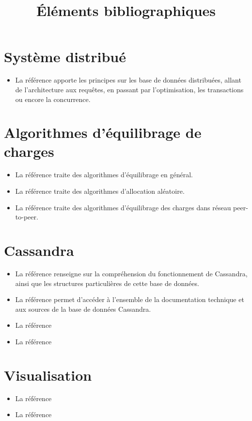 \documentclass[12 pt]{article}
\title{Éléments bibliographiques}
\begin{document}
\maketitle
\section{Système distribué}

\begin{itemize}
\item La référence \cite{RefOzsu2011} apporte les principes sur les base de données distribuées, allant de l'architecture aux requêtes, en passant par l'optimisation, les transactions ou encore la concurrence.
\end{itemize}


\section{Algorithmes d'équilibrage de charges}


\begin{itemize}
\item La référence \cite{RefArtbalancedalloc} traite des algorithmes d'équilibrage en général.

\item La référence \cite{RefRand} traite des algorithmes d'allocation aléatoire.

\item La référence \cite{RefLoadBalancingPeertoPeer} traite des algorithmes d'équilibrage des charges dans réseau peer-to-peer.
\end{itemize}

\section{Cassandra}

\begin{itemize}
\item La référence \cite{RefHewitt2010} renseigne sur la compréhension du fonctionnement de Cassandra, ainsi que les structures particulières de cette base de données.

\item La référence \cite{RefApacheCassandra} permet d'accéder à l'ensemble de la documentation technique et aux sources de la base de données Cassandra.

\item La référence \cite{RefArtFb} 

\item La référence \cite{RefDataStaxfctCassandra}

\end{itemize}

\section{Visualisation}

\begin{itemize}
\item La référence \cite{RefDataStax}

\item La référence \cite{RefTulip}
\end{itemize} 


\end{document}
